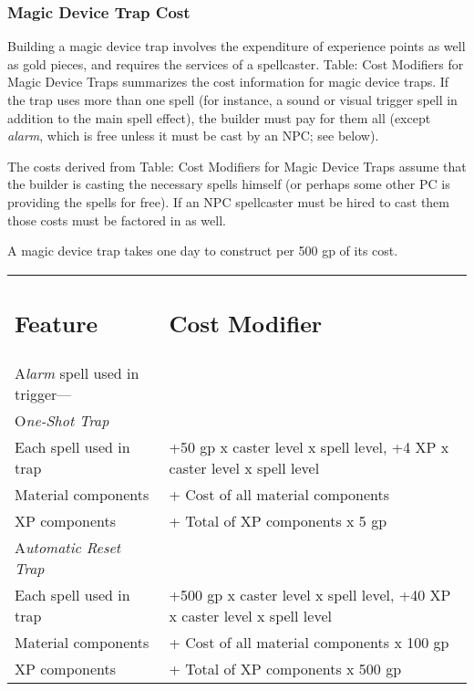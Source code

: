 \documentclass{article}
\begin{document}
\subsubsection*{\textbf{Magic Device Trap Cost}}

Building a magic device trap involves the expenditure of experience points as well 
as gold pieces, and requires the services of a spellcaster. Table: Cost Modifiers 
for Magic Device Traps summarizes the cost information for magic device traps. 
If the trap uses more than one spell (for instance, a sound or visual trigger spell 
in addition to the main spell effect), the builder must pay for them all (except 
\textit{alarm}, which is free unless it must be cast by an NPC; see below).

The costs derived from Table: Cost Modifiers for Magic Device Traps assume that 
the builder is casting the necessary spells himself (or perhaps some other PC is 
providing the spells for free). If an NPC spellcaster must be hired to cast them 
those costs must be factored in as well.

A magic device trap takes one day to construct per 500 gp of its cost.

\vspace{12pt}
\begin{tabular}{|>{\raggedright}p{105pt}|>{\raggedright}p{172pt}|}
\hline
\multicolumn{2}{|p{277pt}|}{T\textbf{able: Cost Modifiers for Magic Device Traps}}\tabularnewline
\hline
\subsection*{F\textbf{eature}} & \subsection*{C\textbf{ost Modifier}}\tabularnewline
\hline
A\textit{larm }spell used in trigger--- & \tabularnewline
\hline
O\textit{ne-Shot Trap} & \tabularnewline
\hline
Each spell used in trap & +50 gp x caster level x spell level,\linebreak{}
+4 XP x caster level x spell level\tabularnewline
\hline
Material components & + Cost of all material components\tabularnewline
\hline
XP components & + Total of XP components x 5 gp\tabularnewline
\hline
A\textit{utomatic Reset Trap} & \tabularnewline
\hline
Each spell used in trap & +500 gp x caster level x spell level,\linebreak{}
+40 XP x caster level x spell level\tabularnewline
\hline
Material components & + Cost of all material components x 100 gp\tabularnewline
\hline
XP components & + Total of XP components x 500 gp\tabularnewline
\hline
\end{tabular}
\end{document}
